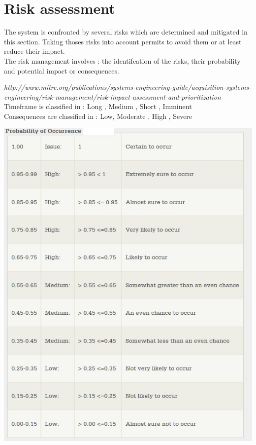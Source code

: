\section{Risk assessment}
The system is confronted by several risks which are determined and mitigated in this section.
Taking thoses risks into account permits to avoid them or at least reduce their impact. \\
The risk management involves : the identifcation of the risks, their probability and potential impact or consequences.

\textit{http://www.mitre.org/publications/systems-engineering-guide/acquisition-systems-engineering/risk-management/risk-impact-assessment-and-prioritization} \\ %
Timeframe is classified in : Long , Medium , Short , Imminent \\
Consequences are classified in : Low, Moderate , High , Severe


\includegraphics[scale=0.5]{3-requirements/Images/RISKSOCCURENCE.jpg} %
